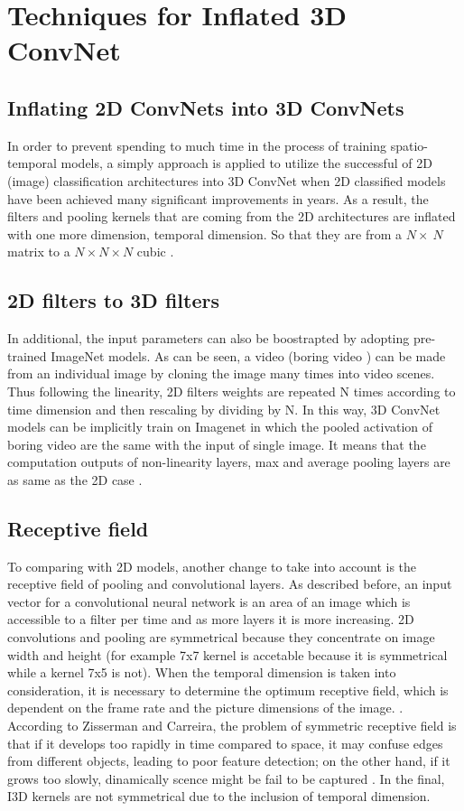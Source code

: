 \documentclass[a4paper, 12pt]{article}
\begin{document}
\newpage

\section{Techniques for Inflated 3D ConvNet}
\subsection{Inflating 2D ConvNets into 3D ConvNets}
In order to prevent spending to much time in the process of training spatio-temporal models, a simply approach is applied to utilize the successful of 2D (image) classification architectures into 3D ConvNet when 2D classified models have been achieved many significant improvements in years. As a result, the filters and pooling kernels that are coming from the 2D architectures are inflated with one more dimension, temporal dimension. So that they are from a $N \times\ N$ matrix to a $N \times N \times N$ cubic \citep{carreira2017quo}.

\subsection{2D filters to 3D filters}
In additional, the input parameters can also be boostrapted by adopting pre-trained ImageNet models. As can be seen, a video (boring video \citep{carreira2017quo}) can be made from an individual image by cloning the image many times into video scenes. Thus following the linearity, 2D filters weights are repeated N times according to time dimension and then rescaling by dividing by N. In this way, 3D ConvNet models can be implicitly train on Imagenet in which the pooled activation of boring video are the same with the input of single image. It means that the computation outputs of non-linearity layers, max and average pooling layers are as same as the 2D case \citep{mansimov2015initialization}.

\subsection{Receptive field}
To comparing with 2D models, another change to take into account is the receptive field of pooling and convolutional layers. As described before, an input vector for a convolutional neural network is an area of an image which is accessible to a filter per time and as more layers it is more increasing. 2D convolutions and pooling are symmetrical because they concentrate on image width and height (for example 7x7 kernel is accetable because it is symmetrical while a kernel 7x5 is not). When the temporal dimension is taken into consideration, it is necessary to determine the optimum receptive field, which is dependent on the frame rate and the picture dimensions of the image. \citep{towardScienceI3DUnderstanding}. According to Zisserman and Carreira, the problem of symmetric receptive field is that if it develops too rapidly in time compared to space, it may confuse edges from different objects, leading to poor feature detection; on the other hand, if it grows too slowly, dinamically scence might be fail to be captured \citep{carreira2017quo}. In the final, I3D kernels are not symmetrical due to the inclusion of temporal dimension.
\end{document}
